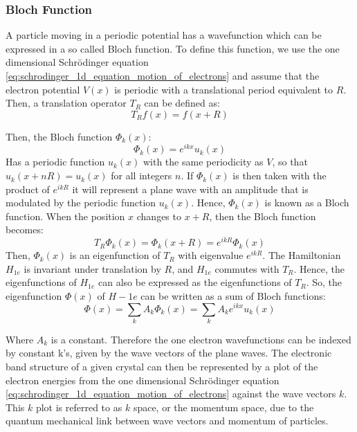 \subsubsection{Bloch Function}
A particle moving in a periodic potential has a wavefunction which can be expressed in a so called Bloch function. To define this function, we use the one dimensional Schr{\"o}dinger equation \ref{eq:schrodinger_1d_equation_motion_of_electrons} and assume that the electron potential $V\left(x\right)$ is periodic with a translational period equivalent to $R$. Then, a translation operator $T_{R}$ can be defined as:
\begin{equation}
    T_{R}f\left(x\right) = f\left(x+R\right)
    \label{eq:translation_operator}
\end{equation}

Then, the Bloch function $\Phi_{k}\left(x\right)$:
\begin{equation}
    \Phi_{k}\left(x\right) = e^{ikx}u_{k}\left(x\right)
    \label{eq:bloch_function}
\end{equation}
Has a periodic function $u_{k}\left(x\right)$ with the same periodicity as $V$, so that $u_{k}\left(x + nR\right)  = u_{k}\left(x\right)$ for all integers $n$. If $\Phi_{k}\left(x\right)$ is then taken with the product of $e^{ikR}$ it will represent a plane wave with an amplitude that is modulated by the periodic function $u_{k}\left(x\right)$. Hence, $\Phi_{k}\left(x\right)$ is known as a Bloch function. When the position $x$ changes to $x+R$, then the Bloch function becomes:
\begin{equation}
    T_{R}\Phi_{k}\left(x\right) = \Phi_{k}\left(x + R\right) = e^{ikR}\Phi_{k}\left(x\right)
    \label{eq:bloch_function_plusR}
\end{equation}
Then, $\Phi_{k}\left(x\right)$ is an eigenfunction of $T_{R}$ with eigenvalue $e^{ikR}$. The Hamiltonian $H_{1e}$ is invariant under translation by $R$, and $H_{1e}$ commutes with $T_{R}$. Hence, the eigenfunctions of $H_{1e}$ can also be expressed as the eigenfunctions of $T_{R}$. So, the eigenfunction $\Phi\left(x\right)$ of $H-{1e}$ can be written as a sum of Bloch functions:
\begin{equation}
    \Phi\left(x\right) = \sum_{k}A_{k}\Phi_{k}\left(x\right) = \sum_{k}A_{k}e^{ikx}u_{k}\left(x\right)
    \label{eq:sum_of_bloch_functions}
\end{equation}

Where $A_{k}$ is a constant. Therefore the one electron wavefunctions can be indexed by constant k's, given by the wave vectors of the plane waves. The electronic band structure of a given crystal can then be represented by a plot of the electron energies from the one dimensional Schr{\"o}dinger equation \ref{eq:schrodinger_1d_equation_motion_of_electrons} against the wave vectors $k$. This $k$ plot is referred to as $k$ space, or the momentum space, due to the quantum mechanical link between wave vectors and momentum of particles. 

